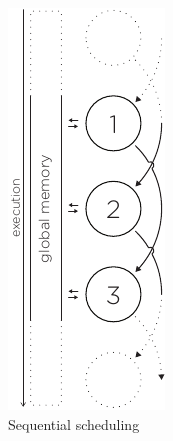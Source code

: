 \begin{figure}
  \begin{minipage}[t]{0.23\textwidth}
    \centering
    \includegraphics[page=1, height=2\linewidth]{../resources/invariance.pdf}
    \caption{Sequential scheduling}

\end{minipage}
\end{figure}
